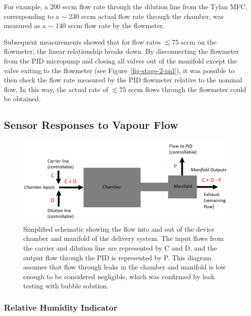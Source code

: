\documentclass[
  a4paper,
]{scrbook}
\begin{document}
For example, a 200 sccm flow rate through the dilution line from the
Tylan MFC, corresponding to a \(\sim\) 230 sccm actual flow rate through
the chamber, was measured as a \(\sim\) 140 sccm flow rate by the
flowmeter.

Subsequent measurements showed that for flow rates \(\lesssim 75\) sccm
on the flowmeter, the linear relationship breaks down. By disconnecting
the flowmeter from the PID micropump and closing all valves out of the
manifold except the valve exiting to the flowmeter (see
Figure~\ref{fig-stage-2-pid}), it was possible to then check the flow
rate measured by the PID flowmeter relative to the nominal flow. In this
way, the actual rate of \(\lesssim 75\) sccm flows through the flowmeter
could be obtained.

\hypertarget{sensor-responses-to-vapour-flow}{%
\subsection{Sensor Responses to Vapour
Flow}\label{sensor-responses-to-vapour-flow}}

\begin{figure}

{\centering \includegraphics[width=1\textwidth,height=\textheight]{figures/ch5/chamber-manifold-v2.png}

}

\caption{Simplified schematic showing the flow into and out of the
device chamber and manifold of the delivery system. The input flows from
the carrier and dilution line are represented by C and D, and the output
flow through the PID is represented by P. This diagram assumes that flow
through leaks in the chamber and manifold is low enough to be considered
negligible, which was confirmed by leak testing with bubble solution.}

\end{figure}

\hypertarget{relative-humidity-indicator}{%
\subsubsection*{Relative Humidity
Indicator}\label{relative-humidity-indicator}}
\end{document}
